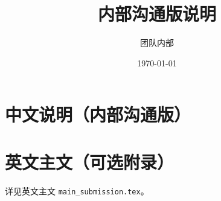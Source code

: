 \documentclass{ctexart}
\title{内部沟通版说明}
\author{团队内部}
\date{\today}
\begin{document}
\maketitle

\section{中文说明（内部沟通版）}


\section{英文主文（可选附录）}
详见英文主文 \texttt{main\_submission.tex}。
\end{document}
